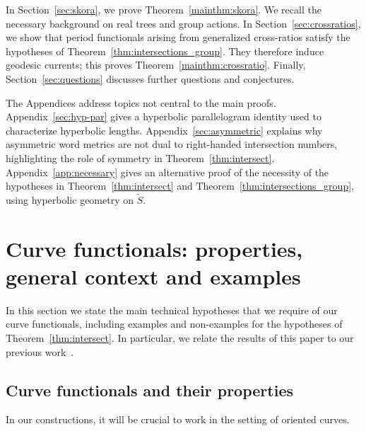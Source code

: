 \documentclass[11pt]{amsart}
\numberwithin{equation}{section}
\numberwithin{figure}{section}
\theoremstyle{definition}
\theoremstyle{plain}
\newcommand*{\wt}[1]{\widetilde{#1}}
\begin{document}
In Section~\ref{sec:skora}, we prove Theorem~\ref{mainthm:skora}. We recall the necessary background on real trees and group actions.
In Section~\ref{sec:crossratios}, we show that period functionals
arising from generalized cross-ratios satisfy the hypotheses of
Theorem~\ref{thm:intersections_group}. They therefore induce geodesic
currents; this proves Theorem~\ref{mainthm:crossratio}.
Finally, Section~\ref{sec:questions} discusses further questions and conjectures.

The Appendices address topics not central to the main proofs. Appendix~\ref{sec:hyp-par} gives a hyperbolic
parallelogram identity used to characterize hyperbolic lengths.
Appendix~\ref{sec:asymmetric} explains why asymmetric word metrics are
not dual to right-handed intersection numbers, highlighting the role
of symmetry in Theorem~\ref{thm:intersect}.
Appendix~\ref{app:necessary} gives an alternative proof of the
necessity of the hypotheses in Theorem~\ref{thm:intersect} and
Theorem~\ref{thm:intersections_group}, using hyperbolic geometry on $\wt{S}$.
























\section{Curve functionals: properties, general context and examples}
\label{sec:functionals}

In this section we state the main technical hypotheses that we require
of our curve functionals, including examples and non-examples for the
hypotheses of Theorem~\ref{thm:intersect}.
In particular, we relate the results of this paper to our previous
work~\cite{MGT21:Smoothings}.

\subsection{Curve functionals and their properties}
\label{subsec:mainhypotheses}

In our constructions, it will be crucial to work in the setting of oriented curves.
\end{document}
